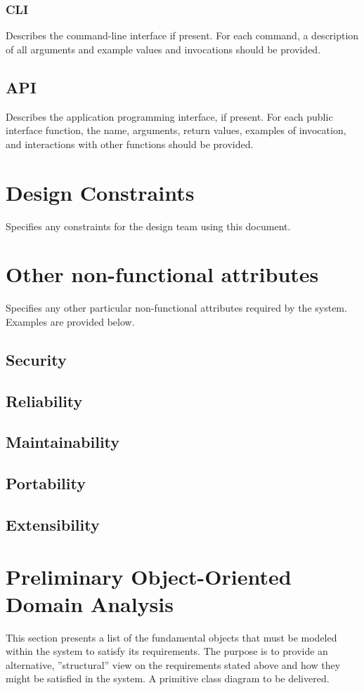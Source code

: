 \documentclass[]{article}
\begin{document}
\subsubsection { CLI}
Describes the command-line interface if present. For each command, a description of all arguments and example values and invocations should be provided. 

\subsection {API}
Describes the application programming interface, if present. For each public interface function, the name, arguments, return values, examples of invocation, and interactions with other functions should be provided. 

\section{Design Constraints}
Specifies any constraints for the design team using this document. 

\section{Other non-functional attributes}
Specifies any other particular non-functional attributes required by the system. Examples are provided below. 

\subsection {Security}
\subsection {Reliability}
\subsection {Maintainability}
\subsection {Portability}
\subsection {Extensibility}

\section{Preliminary Object-Oriented Domain Analysis}
This section presents a list of the fundamental objects that must be modeled within the system to satisfy its requirements. The purpose is to provide an alternative, ''structural'' view on the requirements stated above and how they might be satisfied in the system. A primitive class diagram to be delivered.
\end{document}
